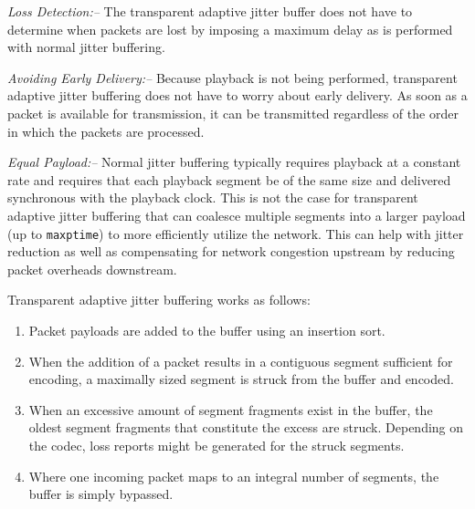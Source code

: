 \documentclass[letterpaper,final,notitlepage,twocolumn,10pt,twoside]{article}
\begin{document}
\begin{description}

\item{\it Loss Detection:--} The transparent adaptive jitter buffer does not
have to determine when packets are lost by imposing a maximum delay as is
performed with normal jitter buffering.

\item{\it Avoiding Early Delivery:--}  Because playback is not being performed,
transparent adaptive jitter buffering does not have to worry about early
delivery.  As soon as a packet is available for transmission, it can be
transmitted regardless of the order in which the packets are processed.

\item{\it Equal Payload:--}  Normal jitter buffering typically requires playback
at a constant rate and requires that each playback segment be of the same size
and delivered synchronous with the playback clock.  This is not the case for
transparent adaptive jitter buffering that can coalesce multiple segments into a
larger payload (up to {\tt maxptime}) to more efficiently utilize the network.
This can help with jitter reduction as well as compensating for network
congestion upstream by reducing packet overheads downstream.

\end{description}

Transparent adaptive jitter buffering works as follows:

\begin{enumerate}

\item Packet payloads are added to the buffer using an insertion sort.

\item When the addition of a packet results in a contiguous segment sufficient
for encoding, a maximally sized segment is struck from the buffer and encoded.

\item When an excessive amount of segment fragments exist in the buffer, the
oldest segment fragments that constitute the excess are struck.  Depending on
the codec, loss reports might be generated for the struck segments.

\item Where one incoming packet maps to an integral number of segments, the
buffer is simply bypassed.

\end{enumerate}
\end{document}
